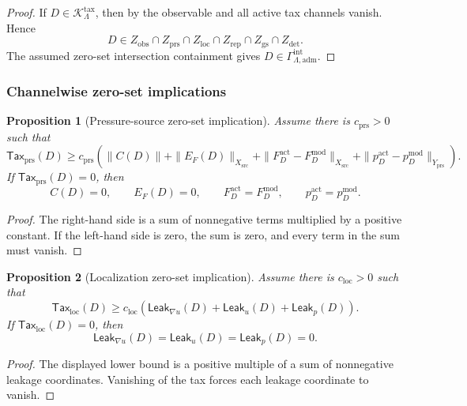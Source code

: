 \documentclass[11pt]{article}
\numberwithin{equation}{section}
\newtheorem{proposition}[proposition]{Proposition}
\theoremstyle{definition}
\theoremstyle{remark}
\newcommand{\adm}{\mathrm{adm}}
\newcommand{\src}{\mathrm{src}}
\newcommand{\detc}{\mathrm{det}}
\newcommand{\Tax}{\mathsf{Tax}}
\newcommand{\Leak}{\mathsf{Leak}}
\begin{document}
\begin{proof}
If \(D\in\mathcal K_{\Lambda}^{\mathrm{tax}}\), then by
 the observable and all active tax channels vanish.  Hence
\[
    D\in
    Z_{\mathrm{obs}}
    \cap
    Z_{\mathrm{prs}}
    \cap
    Z_{\mathrm{loc}}
    \cap
    Z_{\mathrm{rep}}
    \cap
    Z_{\mathrm{gs}}
    \cap
    Z_{\detc}.
\]
The assumed zero-set intersection containment gives
\(D\in\Gamma_{\Lambda,\adm}^{\mathrm{int}}\).
\end{proof}

\subsubsection{Channelwise zero-set implications}

\begin{proposition}[Pressure-source zero-set implication]
\label{prop:prs-zero-set}
Assume there is \(c_{\mathrm{prs}}>0\) such that
\[
    \Tax_{\mathrm{prs}}(D)
    \ge
    c_{\mathrm{prs}}
    \left(
        \|C(D)\|
        +
        \|E_F(D)\|_{X_{\src}}
        +
        \|F^{\mathrm{act}}_D-F^{\mathrm{mod}}_D\|_{X_{\src}}
        +
        \|p_D^{\mathrm{act}}-p_D^{\mathrm{mod}}\|_{Y_{\mathrm{prs}}}
    \right).
\]
If \(\Tax_{\mathrm{prs}}(D)=0\), then
\[
    C(D)=0,\qquad
    E_F(D)=0,\qquad
    F^{\mathrm{act}}_D=F^{\mathrm{mod}}_D,\qquad
    p_D^{\mathrm{act}}=p_D^{\mathrm{mod}}.
\]
\end{proposition}

\begin{proof}
The right-hand side is a sum of nonnegative terms multiplied by a positive
constant.  If the left-hand side is zero, the sum is zero, and every term in the
sum must vanish.
\end{proof}

\begin{proposition}[Localization zero-set implication]
\label{prop:loc-zero-set}
Assume there is \(c_{\mathrm{loc}}>0\) such that
\[
    \Tax_{\mathrm{loc}}(D)
    \ge
    c_{\mathrm{loc}}
    \left(
        \Leak_{\nabla u}(D)
        +
        \Leak_u(D)
        +
        \Leak_p(D)
    \right).
\]
If \(\Tax_{\mathrm{loc}}(D)=0\), then
\[
    \Leak_{\nabla u}(D)=\Leak_u(D)=\Leak_p(D)=0.
\]
\end{proposition}

\begin{proof}
The displayed lower bound is a positive multiple of a sum of nonnegative
leakage coordinates.  Vanishing of the tax forces each leakage coordinate to
vanish.
\end{proof}
\end{document}
